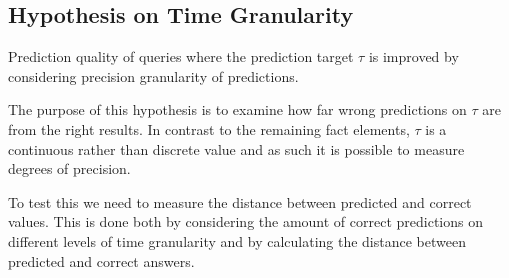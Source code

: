 \subsection{Hypothesis on Time Granularity}
\label{sec:hypothesis_time_granularity}

\begin{hypothesis}
\label{hyp:time_granularity}
Prediction quality of queries where the prediction target $\tau$ is improved by considering precision granularity of predictions.
\end{hypothesis}

The purpose of this hypothesis is to examine how far wrong predictions on $\tau$ are from the right results. 
In contrast to the remaining fact elements, $\tau$ is a continuous rather than discrete value and as such it is possible to measure degrees of precision.

To test this we need to measure the distance between predicted and correct values.
This is done both by considering the amount of correct predictions on different levels of time granularity and by calculating the distance between predicted and correct answers.
